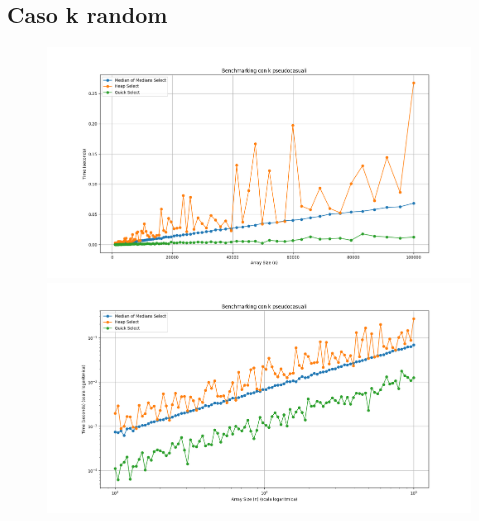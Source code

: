\documentclass[a4paper]{article}
\begin{document}
\subsection{Caso k random}
\begin{figure}[h]
            \centering
            \includegraphics[width=.83\textwidth]{graphs/K_random_n.png}
            \includegraphics[width=.83\textwidth]{graphs/K_random_2xlog.png}
\end{figure}
\end{document}
